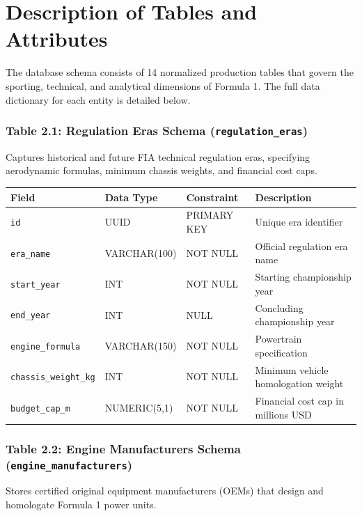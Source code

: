 \documentclass[12pt,a4paper]{report}
\begin{document}
\newpage
\section{Description of Tables and Attributes}
The database schema consists of 14 normalized production tables that govern the sporting, technical, and analytical dimensions of Formula 1. The full data dictionary for each entity is detailed below.

\vspace{0.3cm}
\subsubsection*{Table 2.1: Regulation Eras Schema (\textnormal{\texttt{regulation\_eras}})}
Captures historical and future FIA technical regulation eras, specifying aerodynamic formulas, minimum chassis weights, and financial cost caps.

\begin{table}[H]
\centering
\small
\begin{tabularx}{\textwidth}{l p{2.6cm} p{2.6cm} X}
\toprule
\rowcolor{gray!15}
\textbf{Field} & \textbf{Data Type} & \textbf{Constraint} & \textbf{Description} \\
\midrule
\texttt{id} & UUID & PRIMARY KEY & Unique era identifier \\
\texttt{era\_name} & VARCHAR(100) & NOT NULL & Official regulation era name \\
\texttt{start\_year} & INT & NOT NULL & Starting championship year \\
\texttt{end\_year} & INT & NULL & Concluding championship year \\
\texttt{engine\_formula} & VARCHAR(150) & NOT NULL & Powertrain specification \\
\texttt{chassis\_weight\_kg} & INT & NOT NULL & Minimum vehicle homologation weight \\
\texttt{budget\_cap\_m} & NUMERIC(5,1) & NOT NULL & Financial cost cap in millions USD \\
\bottomrule
\end{tabularx}
\end{table}

\vspace{0.3cm}
\subsubsection*{Table 2.2: Engine Manufacturers Schema (\textnormal{\texttt{engine\_manufacturers}})}
Stores certified original equipment manufacturers (OEMs) that design and homologate Formula 1 power units.
\end{document}
